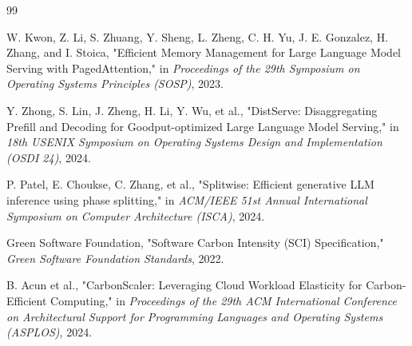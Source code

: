 \documentclass[12pt,a4paper,oneside]{report}
\begin{document}
\begin{thebibliography}{99}

W. Kwon, Z. Li, S. Zhuang, Y. Sheng, L. Zheng, C. H. Yu, J. E. Gonzalez, H. Zhang, and I. Stoica, "Efficient Memory Management for Large Language Model Serving with PagedAttention," in \textit{Proceedings of the 29th Symposium on Operating Systems Principles (SOSP)}, 2023.

Y. Zhong, S. Lin, J. Zheng, H. Li, Y. Wu, et al., "DistServe: Disaggregating Prefill and Decoding for Goodput-optimized Large Language Model Serving," in \textit{18th USENIX Symposium on Operating Systems Design and Implementation (OSDI 24)}, 2024.

P. Patel, E. Choukse, C. Zhang, et al., "Splitwise: Efficient generative LLM inference using phase splitting," in \textit{ACM/IEEE 51st Annual International Symposium on Computer Architecture (ISCA)}, 2024.

Green Software Foundation, "Software Carbon Intensity (SCI) Specification," \textit{Green Software Foundation Standards}, 2022.

B. Acun et al., "CarbonScaler: Leveraging Cloud Workload Elasticity for Carbon-Efficient Computing," in \textit{Proceedings of the 29th ACM International Conference on Architectural Support for Programming Languages and Operating Systems (ASPLOS)}, 2024.

\end{thebibliography}
\end{document}
